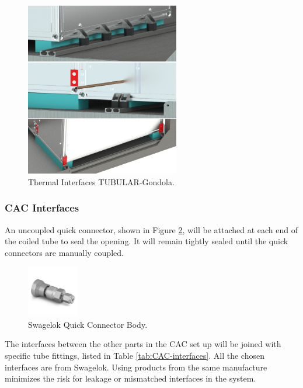 \begin{figure}[H]
    \centering
    \includegraphics[width=0.6\textwidth]{4-experiment-design/img/Mechanical/gondola_fixation.png}
    \caption{Thermal Interfaces TUBULAR-Gondola.}
    \label{fig:thermal_interface}
\end{figure}

\subsubsection{CAC Interfaces}
An uncoupled quick connector, shown in Figure \ref{fig:Quick-connector-body}, will be attached at each end of the coiled tube to seal the opening. It will remain tightly sealed until the quick connectors are manually coupled. 

\begin{figure}[H]
    \centering
    \includegraphics[width=0.2\textwidth]{4-experiment-design/img/Mechanical/CAC-QC-Outlet.jpg}
    \caption{Swagelok Quick Connector Body.}
    \label{fig:Quick-connector-body}
\end{figure}

The interfaces between the other parts in the CAC set up will be joined with specific tube fittings, listed in Table \ref{tab:CAC-interfaces}. All the chosen interfaces are from Swagelok. Using products from the same manufacture minimizes the risk for leakage or mismatched interfaces in the system. 

